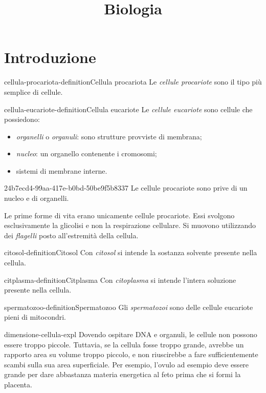 \documentclass[preview]{standalone}
\begin{document}
\title{Biologia}
\genpage

\section{Introduzione}

\begin{snippetdefinition}{cellula-procariota-definition}{Cellula procariota}
    Le \textit{cellule procariote} sono il tipo più semplice di cellule.
\end{snippetdefinition}

\begin{snippetdefinition}{cellula-eucariote-definition}{Cellula eucariote}
    Le \textit{cellule eucariote} sono cellule
    che possiedono:
    \begin{itemize}
        \item \textit{organelli} o \textit{organuli}: sono strutture provviste di membrana;
        \item \textit{nucleo}: un organello contenente i cromosomi;
        \item sistemi di membrane interne.
    \end{itemize}
\end{snippetdefinition}

\begin{snippet}{24b7ecd4-99aa-417e-b0bd-50be9f5b8337}
    Le cellule procariote sono prive di un nucleo e di organelli.

    Le prime forme di vita erano unicamente cellule procariote.
    Essi svolgono esclusivamente la glicolisi e non la respirazione cellulare.
    Si muovono utilizzando dei \textit{flagelli} posto all'estremità della cellula.
\end{snippet}


\begin{snippetdefinition}{citosol-definition}{Citosol}
    Con \textit{citosol} si intende la sostanza solvente presente nella cellula.
\end{snippetdefinition}

\begin{snippetdefinition}{citplasma-definition}{Citplasma}
    Con \textit{citoplasma} si intende l'intera soluzione presente nella cellula.
\end{snippetdefinition}

\begin{snippetdefinition}{spermatozoo-definition}{Spermatozoo}
    Gli \textit{spermatozoi} sono delle cellule eucariote pieni di mitocondri.
\end{snippetdefinition}

\begin{snippet}{dimensione-cellula-expl}
    Dovendo ospitare DNA e organuli, le cellule non possono essere troppo piccole.
    Tuttavia, se la cellula fosse troppo grande, avrebbe un rapporto area su volume troppo piccolo, e non riuscirebbe
    a fare sufficientemente scambi sulla sua area superficiale.
    Per esempio, l'ovulo ad esempio deve essere grande per dare
    abbastanza materia energetica al feto prima che si
    formi la placenta.
\end{snippet}
\end{document}

